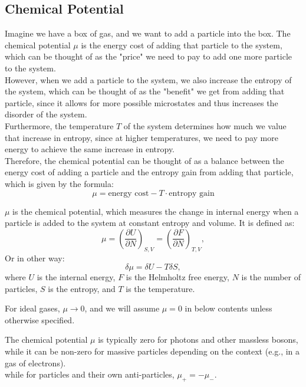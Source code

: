 \subsection{Chemical Potential}
\begin{intuition}
    Imagine we have a box of gas, and we want to add a particle into the box. The chemical potential $\mu$ is the energy cost of adding that particle to the system, which can be thought of as the "price" we need to pay to add one more particle to the system.\\

    However, when we add a particle to the system, we also increase the entropy of the system, which can be thought of as the "benefit" we get from adding that particle, since it allows for more possible microstates and thus increases the disorder of the system.\\

    Furthermore, the temperature $T$ of the system determines how much we value that increase in entropy, since at higher temperatures, we need to pay more energy to achieve the same increase in entropy.\\

    Therefore, the chemical potential can be thought of as a balance between the energy cost of adding a particle and the entropy gain from adding that particle, which is given by the formula:
    \[
        \mu = \text{energy cost} - T \cdot \text{entropy gain}
    \]
\end{intuition}

\bigskip\noindent
\begin{foundation}
    $\mu$ is the chemical potential, which measures the change in internal energy when a particle is added to the system at constant entropy and volume. It is defined as:
    \[
        \mu = \left( \frac{\partial U}{\partial N} \right)_{S,V} = \left( \frac{\partial F}{\partial N} \right)_{T,V} ,
    \] 
    Or in other way:
    \[
        \delta \mu = \delta U - T \delta S,
    \]
    where $U$ is the internal energy, $F$ is the Helmholtz free energy, $N$ is the number of particles, $S$ is the entropy, and $T$ is the temperature.\\
\end{foundation}

For ideal gases, $\mu \to 0$, and we will assume $\mu = 0$ in below contents unless otherwise specified.

\begin{remark}
  The chemical potential $\mu$ is typically zero for photons and other massless bosons, while it can be non-zero for massive particles depending on the context (e.g., in a gas of electrons).\\

  while for particles and their own anti-particles, $\mu_+ = -\mu_-$.
\end{remark}

